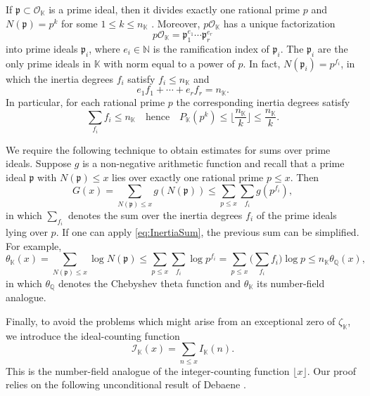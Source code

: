 \documentclass[10pt,reqno]{amsart}
\theoremstyle{plain}
\theoremstyle{definition}
\newcommand{\Q}{\mathbb{Q}}
\newcommand{\N}{\mathbb{N}}
\newcommand{\K}{\mathbb{K}}
\newcommand{\PP}{\mathfrak{p}}
\renewcommand{\O}{\mathcal{O}}
\newcommand{\I}{\mathcal{I}}
\begin{document}
If $\PP\subset\mathcal{O}_{\K}$ is a prime ideal, then it divides exactly one rational prime $p$ and $N(\mathfrak{p}) = p^k$ for some $1\leq k\leq n_{\K}$ \cite[Thm.~5.14c]{StewartTall}.
Moreover, $p\O_{\K}$ has a unique factorization
\begin{equation*}
p\O_{\K} = \PP_1^{e_1} \cdots \PP_r^{e_r}
\end{equation*}
into prime ideals $\PP_i$, where $e_i \in \N$ is the ramification index of $\PP_i$.
The $\PP_i$ are the only prime ideals in $\K$ with norm equal to a power of $p$.
In fact, $N(\PP_i) = p^{f_i}$, in which the inertia degrees $f_i$ satisfy $f_i\leq n_{\K}$ and
\begin{equation*}
e_1 f_1 + \cdots + e_r f_r = n_{\K}.
\end{equation*}
In particular, for each rational prime $p$ the corresponding inertia degrees satisfy
\begin{equation}\label{eq:InertiaSum}
    {\sum_{f_i}} f_i \leq n_{\K}\quad\text{hence}\quad P_{\K}(p^k)\leq \bigg\lfloor \frac{n_{\K}}{k} \bigg\rfloor \leq \frac{n_{\K}}{k}.
\end{equation}

We require the following technique to obtain estimates for sums over prime ideals.
Suppose $g$ is a non-negative arithmetic function and recall that a prime ideal $\PP$ with $N(\PP) \leq x$ lies over exactly one rational prime $p \leq x$.  Then
\begin{equation*}
    G(x)
    = \sum_{N(\PP)\leq x} g(N(\PP))
    \leq \sum_{p\leq x}{\sum_{f_i}} g(p^{f_i}),
\end{equation*}
in which $\sum_{f_i}$ denotes the sum over the inertia degrees $f_i$ of the prime ideals lying over $p$. 
If one can apply \eqref{eq:InertiaSum}, the previous sum can be simplified.  For example,
\begin{equation*}
    \theta_{\K}(x)
    = \sum_{N(\PP)\leq x} \log{N(\PP)} 
    \leq \sum_{p\leq x}\sum_{f_i} \log{p^{f_i}}
    = \sum_{p\leq x}\bigg(\sum_{f_i} f_i\bigg) \log{p}
    \leq n_{\K}\theta_{\Q}(x),
\end{equation*}
in which $\theta_{\Q}$ denotes the Chebyshev theta function and $\theta_{\K}$ its number-field analogue.

Finally, to avoid the problems which might arise from an exceptional zero of $\zeta_{\K}$, we introduce the ideal-counting function 
\begin{equation*}
\I_{\K}(x) = \sum_{n\leq x} I_{\K}(n).
\end{equation*}
This is the number-field analogue of the integer-counting function $\lfloor x \rfloor$. Our proof relies 
on the following unconditional result of Debaene \cite[Cor.~2]{Debaene}.
\end{document}
